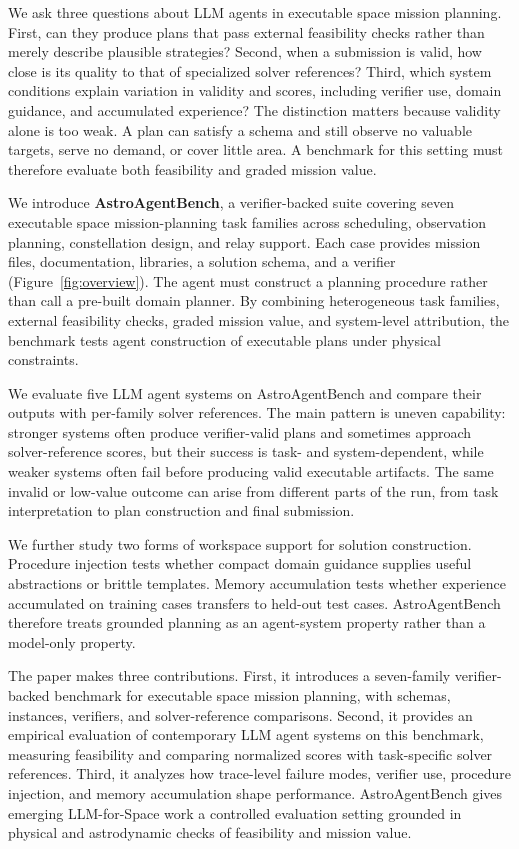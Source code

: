 \documentclass[]{mosi}
\begin{document}
We ask three questions about LLM agents in executable space mission planning. First, can they produce plans that pass external feasibility checks rather than merely describe plausible strategies? Second, when a submission is valid, how close is its quality to that of specialized solver references? Third, which system conditions explain variation in validity and scores, including verifier use, domain guidance, and accumulated experience? The distinction matters because validity alone is too weak. A plan can satisfy a schema and still observe no valuable targets, serve no demand, or cover little area. A benchmark for this setting must therefore evaluate both feasibility and graded mission value.

We introduce \textbf{AstroAgentBench}, a verifier-backed suite covering seven executable space mission-planning task families across scheduling, observation planning, constellation design, and relay support. Each case provides mission files, documentation, libraries, a solution schema, and a verifier (Figure~\ref{fig:overview}). The agent must construct a planning procedure rather than call a pre-built domain planner. By combining heterogeneous task families, external feasibility checks, graded mission value, and system-level attribution, the benchmark tests agent construction of executable plans under physical constraints.

We evaluate five LLM agent systems on AstroAgentBench and compare their outputs with per-family solver references. The main pattern is uneven capability: stronger systems often produce verifier-valid plans and sometimes approach solver-reference scores, but their success is task- and system-dependent, while weaker systems often fail before producing valid executable artifacts. The same invalid or low-value outcome can arise from different parts of the run, from task interpretation to plan construction and final submission.

We further study two forms of workspace support for solution construction. Procedure injection tests whether compact domain guidance supplies useful abstractions or brittle templates. Memory accumulation tests whether experience accumulated on training cases transfers to held-out test cases. AstroAgentBench therefore treats grounded planning as an agent-system property rather than a model-only property.

The paper makes three contributions. First, it introduces a seven-family verifier-backed benchmark for executable space mission planning, with schemas, instances, verifiers, and solver-reference comparisons. Second, it provides an empirical evaluation of contemporary LLM agent systems on this benchmark, measuring feasibility and comparing normalized scores with task-specific solver references. Third, it analyzes how trace-level failure modes, verifier use, procedure injection, and memory accumulation shape performance. AstroAgentBench gives emerging LLM-for-Space work a controlled evaluation setting grounded in physical and astrodynamic checks of feasibility and mission value.
\end{document}
